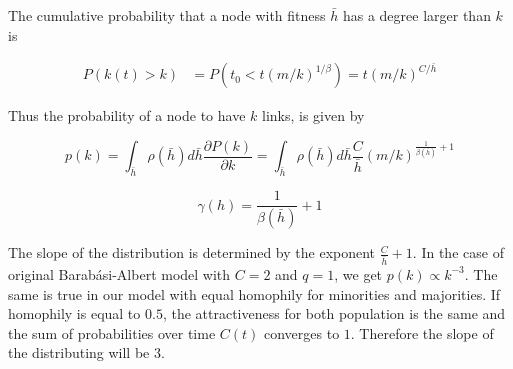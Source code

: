 The cumulative probability that a node with fitness $\bar{h}$ has a degree larger than $k$ is

\begin{align*}
    P(k(t)> k) &= P(t_{0} < t(m/k)^{1/\beta}) = t (m/k) ^{C/\bar{h}}
\end{align*}

Thus the probability of a node to have $k$ links, is given by

\begin{equation}
\label{eq:degree_exponents}
    p(k) = \int_{\bar{h}} \rho(\bar{h}) d\bar{h} \frac{\partial P(k)}{\partial k} =  \int_{\bar{h}} \rho(\bar{h}) d\bar{h} \frac{C}{\bar{h}} (m/k)^{\frac{1}{\beta(\bar{h})} + 1}
\end{equation}

\begin{equation}
\label{eq:degree_exponent}
    \gamma(h) =\frac{1}{\beta(\bar{h})} + 1
\end{equation}

The slope of the distribution is determined by the exponent $\frac{C}{\bar{h}} + 1$. In the case of original Barab\'{a}si-Albert model with $C=2$ and $q = 1$, we get $p(k) \propto k^{-3}$. The same is true in our model with equal homophily for minorities and majorities. If homophily is equal to $0.5$, the attractiveness for both population is the same and the sum of probabilities over time $C(t)$ converges to $1$. Therefore the slope of the distributing will be 3.









